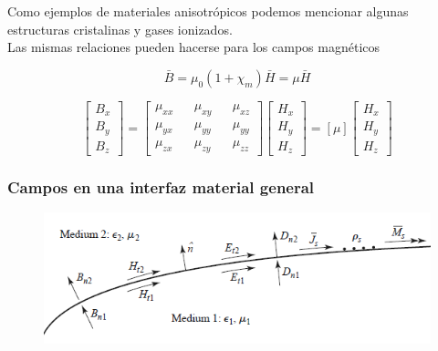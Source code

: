 Como ejemplos de materiales anisotrópicos podemos mencionar algunas estructuras cristalinas y gases ionizados. \\

Las mismas relaciones pueden hacerse para los campos magnéticos 

\begin{equation*}
\bar{B} = \mu_0 (1 + \chi_m) \bar{H} = \mu \bar{H}
\end{equation*}

\begin{equation*}
\left[
\begin{aligned}
    B_x \\
    B_y \\
    B_z
\end{aligned}
\right] = 
\left[
\begin{aligned}
    \mu_{xx} && \mu_{xy}  && \mu_{xz}  \\
    \mu_{yx} && \mu_{yy}  && \mu_{yy}  \\
    \mu_{zx} && \mu_{zy}  && \mu_{zz}  
\end{aligned}
\right]
\left[
\begin{aligned}
    H_x \\
    H_y \\
    H_z
\end{aligned}
\right] = [\mu]
\left[
\begin{aligned}
    H_x \\
    H_y \\
    H_z
\end{aligned}
\right]
\end{equation*}

\subsubsection*{Campos en una interfaz material general}


\begin{figure}[H]
    \centering
    \includegraphics[scale=0.6]{Waves/waves_f6.png}
\end{figure}


